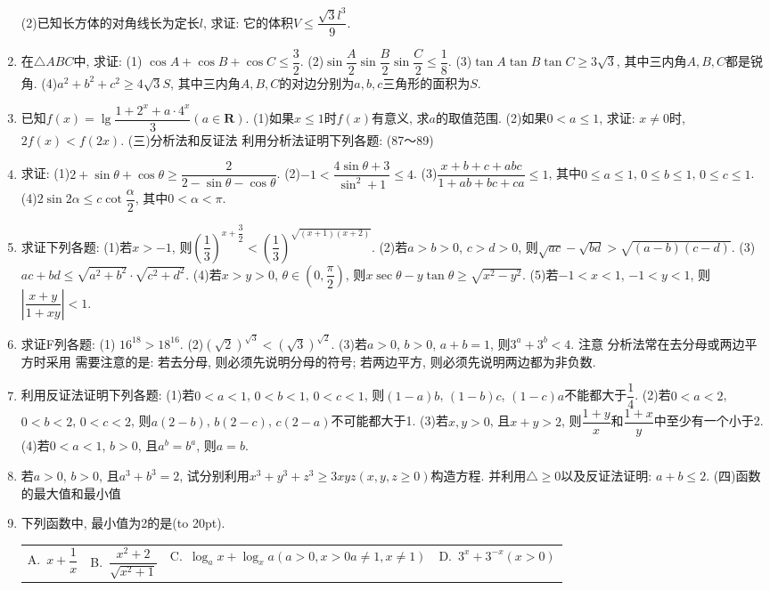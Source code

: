 \documentclass[10pt,a4paper]{article}
\newcommand{\bracket}[1]{(\hbox to #1pt{})}
\newcommand{\fourch}[4]{\par\begin{tabular}{p{.23\textwidth}p{.23\textwidth}p{.23\textwidth}p{.23\textwidth}}
A.~#1 &B.~#2& C.~#3& D.~#4
\end{tabular}}
\begin{document}
\begin{enumerate}[1.]
        (2)已知长方体的对角线长为定长$l$, 求证: 它的体积$V\le \dfrac{\sqrt 3{l^3}}9$.
    \item 在$\triangle ABC$中, 求证:
        (1) $\cos A+\cos B+\cos C\le \dfrac 32$.
        (2)$\sin \dfrac A2\sin \dfrac B2\sin \dfrac C2\le \dfrac 18$.
        (3)$\tan A\tan B\tan C\ge 3\sqrt 3$, 其中三内角$A,B,C$都是锐角.
        (4)${a^2}+{b^2}+{c^2}\ge 4\sqrt 3S$, 其中三内角$A,B,C$的对边分别为$a,b,c$三角形的面积为$S$.
    \item 已知$f(x)=\lg \dfrac{1+{2^x}+a\cdot {4^x}}3(a\in \mathbf{R})$.
    (1)如果$x\le 1$时$f(x)$有意义, 求$a$的取值范围.
    (2)如果$0<a\le 1$, 求证: $x\ne 0$时, $2f(x)<f(2x)$.
    (三)分析法和反证法
    利用分析法证明下列各题: (87～89)
    \item 求证:
    (1)$2+\sin \theta +\cos \theta \ge \dfrac 2{2-\sin \theta -\cos \theta }$.
    (2)$-1<\dfrac{4\sin \theta +3}{{{\sin }^2}+1}\le 4$.
    (3)$\dfrac{x+b+c+abc}{1+ab+bc+ca}\le 1$, 其中$0\le a\le 1$, $0\le b\le 1$, $0\le c\le 1$.
    (4)$2\sin 2\alpha \le c\cot \dfrac{\alpha }2$, 其中$0<\alpha <\pi$.
    \item 求证下列各题:
    (1)若$x>-1$, 则${{(\dfrac 13)}^{x+\dfrac 32}}<{{(\dfrac 13)}^{\sqrt{(x+1)(x+2)}}}$.
    (2)若$a>b>0$, $c>d>0$, 则$\sqrt{ac}-\sqrt{bd}>\sqrt{(a-b)(c-d)}$.
    (3)$ac+bd\le \sqrt{{a^2}+{b^2}}\cdot \sqrt{{c^2}+{d^2}}$.
    (4)若$x>y>0$, $\theta \in (0,\dfrac{\pi }2)$, 则$x\sec \theta -y\tan \theta \ge \sqrt{{x^2}-{y^2}}$.
    (5)若$-1<x<1$, $-1<y<1$, 则$|\dfrac{x+y}{1+xy}|<1$.
    \item 求证F列各题:
    (1) ${{16}^{18}}>{{18}^{16}}$.
    (2)${{(\sqrt 2)}^{\sqrt 3}}<{{(\sqrt 3)}^{\sqrt 2}}$.
    (3)若$a>0$, $b>0$, $a+b=1$, 则$3^a+3^b<4$.
    注意  分析法常在去分母或两边平方时采用  需要注意的是: 若去分母, 则必须先说明分母的符号; 若两边平方, 则必须先说明两边都为非负数.
    \item 利用反证法证明下列各题:
    (1)若$0<a<1$, $0<b<1$, $0<c<1$, 则$(1-a)b$, $(1-b)c$, $(1-c)a$不能都大于$\dfrac 14$.
    (2)若$0<a<2$, $0<b<2$, $0<c<2$, 则$a(2-b)$, $b(2-c)$, $c(2-a)$不可能都大于1.
    (3)若$x,y>0$, 且$x+y>2$, 则$\dfrac{1+y}x$和$\dfrac{1+x}y$中至少有一个小于2.
    (4)若$0<a<1$, $b>0$, 且$a^b=b^a$, 则$a=b$.
    \item 若$a>0$, $b>0$, 且$a^3+b^3=2$, 试分别利用$x^3+y^3+z^3\ge 3xyz(x,y,z\ge 0)$构造方程. 并利用$\triangle \ge 0$以及反证法证明: $a+b\le 2$.
    (四)函数的最大值和最小值
    \item 下列函数中, 最小值为2的是\bracket{20}.
    \fourch{$x+\dfrac 1x$}{$\dfrac{{x^2}+2}{\sqrt{{x^2}+1}}$}{$\log_ax+\log_xa(a>0,x>0a\ne 1,x\ne 1)$}{$3^x+{3^{-x}}(x>0)$}

\end{enumerate}
\end{document}
